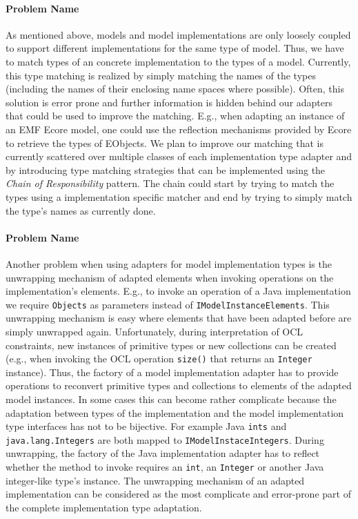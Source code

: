 	\paragraph{Problem Name}
	As mentioned above, models and model implementations are only loosely 
	coupled to support different implementations for the same type of model.
	 Thus, we have to match types of an concrete implementation to
	the types of a model. Currently, this type matching is realized by simply 
	matching the names of the types (including the names of 
	their enclosing name spaces where possible). Often, this solution is error 
	prone and further information is hidden behind our adapters that could be 
	used to improve the matching. E.g., when adapting an instance of an EMF 
	Ecore model, one could use the reflection mechanisms provided by Ecore to
	retrieve the types of EObjects. We plan to improve our matching
	that is currently scattered over multiple classes of each implementation type 
	adapter and by introducing type matching strategies that 
	can be implemented using the \textit{Chain of Responsibility} 
	pattern\cite{gamma:dp}. The chain could start by trying to match the 
	types using a implementation specific matcher and end by trying to 
	simply match the type's names as currently done.
	
	\paragraph{Problem Name}
	Another problem when using adapters for model implementation types 
	is the unwrapping mechanism of adapted elements when invoking operations 
	on the implementation's elements. E.g., to invoke an operation of a Java 
	implementation we require \texttt{Objects} as parameters instead of 
	\texttt{IModelInstanceElements}. This unwrapping mechanism is easy 
	where elements that have been adapted before are simply unwrapped 
	again. Unfortunately, during interpretation of OCL constraints, 
	new instances of primitive types or new collections can be created 
	(e.g., when invoking the OCL operation \texttt{size()} that 
	returns an \texttt{Integer} instance). Thus, the factory of a 
	model implementation adapter has to provide operations to reconvert 
	primitive types and collections to elements of the adapted model 
	instances. In some cases this can become rather complicate because 
	the adaptation between types of the implementation and the model 
	implementation type interfaces has not to be bijective. For 
	example Java \texttt{ints} and \texttt{java.lang.Integers} are 
	both mapped to \texttt{IModelInstaceIntegers}. During unwrapping, 
	the factory of the Java implementation adapter has to reflect 
	whether the method to invoke requires an \texttt{int}, an 
	\texttt{Integer} or another Java integer-like type's instance.
	 The unwrapping mechanism of an adapted implementation 
	 can be considered as the most complicate and error-prone part 
	 of the complete implementation type adaptation. 



